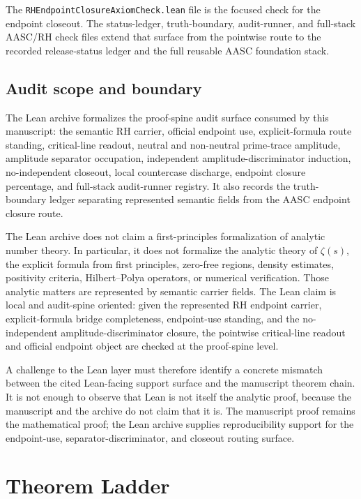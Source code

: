 \documentclass[11pt]{article}
\begin{document}
The \texttt{RHEndpointClosureAxiomCheck.lean} file is the focused check for the endpoint closeout.  The status-ledger, truth-boundary, audit-runner, and full-stack AASC/RH check files extend that surface from the pointwise route to the recorded release-status ledger and the full reusable AASC foundation stack.

\subsection{Audit scope and boundary}

The Lean archive formalizes the proof-spine audit surface consumed by this manuscript: the semantic RH carrier, official endpoint use, explicit-formula route standing, critical-line readout, neutral and non-neutral prime-trace amplitude, amplitude separator occupation, independent amplitude-discriminator induction, no-independent closeout, local countercase discharge, endpoint closure percentage, and full-stack audit-runner registry.  It also records the truth-boundary ledger separating represented semantic fields from the AASC endpoint closure route.

The Lean archive does not claim a first-principles formalization of analytic number theory.  In particular, it does not formalize the analytic theory of \(\zeta(s)\), the explicit formula from first principles, zero-free regions, density estimates, positivity criteria, Hilbert--Polya operators, or numerical verification.  Those analytic matters are represented by semantic carrier fields.  The Lean claim is local and audit-spine oriented: given the represented RH endpoint carrier, explicit-formula bridge completeness, endpoint-use standing, and the no-independent amplitude-discriminator closure, the pointwise critical-line readout and official endpoint object are checked at the proof-spine level.

A challenge to the Lean layer must therefore identify a concrete mismatch between the cited Lean-facing support surface and the manuscript theorem chain.  It is not enough to observe that Lean is not itself the analytic proof, because the manuscript and the archive do not claim that it is.  The manuscript proof remains the mathematical proof; the Lean archive supplies reproducibility support for the endpoint-use, separator-discriminator, and closeout routing surface.

\section{Theorem Ladder}\label{app:ladder}
\end{document}

